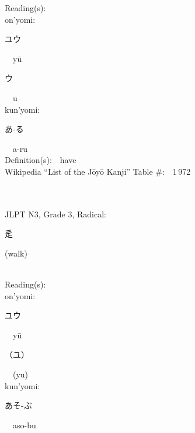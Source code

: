 \begin{multicols}{2}
Reading(s):\ \ \\
{\hspace*{1em}}on'yomi:\ \ \\
{\hspace*{2em}}{\begin{CJK}{UTF8}{min} ユウ \end{CJK}}\ \ y\=u\ \ \\
{\hspace*{2em}}{\begin{CJK}{UTF8}{min} ウ \end{CJK}}\ \ u\ \ \\
{\hspace*{1em}}kun'yomi:\ \ \\
{\hspace*{2em}}{\begin{CJK}{UTF8}{min} あ-る \end{CJK}}\ \ a-ru\ \ \\
Definition(s):\ \ have \\
Wikipedia ``List of the J\=oy\=o Kanji'' Table \#:\ \ 1\,972 \\
\ \ \\
{\fontsize{34pt}{40pt}  }\ \ \\  %
{JLPT N3, Grade 3, Radical:\ \ {\begin{CJK}{UTF8}{min} 辵 \end{CJK}} (walk) } \\
Reading(s):\ \ \\
{\hspace*{1em}}on'yomi:\ \ \\
{\hspace*{2em}}{\begin{CJK}{UTF8}{min} ユウ \end{CJK}}\ \ y\=u\ \ \\
{\hspace*{2em}}{\begin{CJK}{UTF8}{min} （ユ） \end{CJK}}\ \ (yu)\ \ \\
{\hspace*{1em}}kun'yomi:\ \ \\
{\hspace*{2em}}{\begin{CJK}{UTF8}{min} あそ-ぶ \end{CJK}}\ \ aso-bu\ \ \\

\end{multicols}
